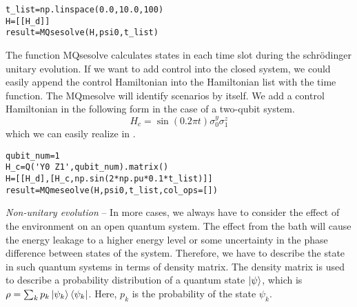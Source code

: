 \begin{lstlisting}
t_list=np.linspace(0.0,10.0,100)
H=[[H_d]]
result=MQsesolve(H,psi0,t_list)
\end{lstlisting}
The function MQsesolve calculates states in each time slot during the schrödinger unitary evolution. If we want to add control into the closed system, we could easily append the control Hamiltonian into the Hamiltonian list with the time function. The MQmesolve will identify scenarios by itself. We add a control Hamiltonian in the following form in the case of a two-qubit system.
\begin{equation}
    H_{c}=\sin(0.2\pi t)\sigma_{0}^{y}\sigma_{1}^{z}
\end{equation}
which we can easily realize in \MindQuantum.
\begin{lstlisting}
qubit_num=1
H_c=Q('Y0 Z1',qubit_num).matrix()
H=[[H_d],[H_c,np.sin(2*np.pu*0.1*t_list)]]
result=MQmeseolve(H,psi0,t_list,col_ops=[])
\end{lstlisting}
\textit{Non-unitary evolution} -- In more cases, we always have to consider the effect of the environment on an open quantum system. The effect from the bath will cause the energy leakage to a higher energy level or some uncertainty in the phase difference between states of the system. Therefore, we have to describe the state in such quantum systems in terms of density matrix. The density matrix is used to describe a probability distribution of a quantum state $\ket{\psi}$, which is $\rho=\sum_{k}p_{k}\ket{\psi_{k}}\bra{\psi_{k}}$. Here, $p_k$ is the probability of the state $\psi_k$.

